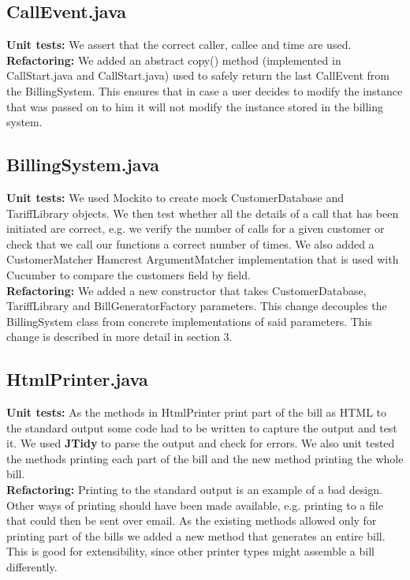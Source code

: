 \documentclass[a4paper]{article}
\begin{document}
\subsection{CallEvent.java}
{\bf Unit tests:} We assert that the correct caller, callee and time are used.
\\{\bf Refactoring:} We added an abstract copy() method (implemented in CallStart.java and CallStart.java) used to safely return the last CallEvent from the BillingSystem. This ensures that in case a user decides to modify the instance that was passed on to him it will not modify the instance stored in the billing system.

\subsection{BillingSystem.java}
{\bf Unit tests:} We used Mockito to create mock CustomerDatabase and TariffLibrary objects. We then test whether all the details of a call that has been initiated are correct, e.g. we verify the number of calls for a given customer or check that we call our functions a correct number of times. We also added a CustomerMatcher Hamcrest ArgumentMatcher implementation that is used with Cucumber to compare the customers field by field.
\\{\bf Refactoring:} We added a new constructor that takes CustomerDatabase, TariffLibrary and BillGeneratorFactory parameters. This change decouples the BillingSystem class from concrete implementations of said parameters. This change is described in more detail in section 3.

\subsection{HtmlPrinter.java}
{\bf Unit tests:} As the methods in HtmlPrinter print part of the bill as HTML to the standard output some code had to be written to capture the output and test it. We used {\bf JTidy} to parse the output and check for errors. We also unit tested the methods printing each part of the bill and the new method printing the whole bill.
\\{\bf Refactoring:} Printing to the standard output is an example of a bad design. Other ways of printing should have been made available, e.g. printing to a file that could then be sent over email. As the existing methods allowed only for printing part of the bills we added a new method that generates an entire bill. This is good for extensibility, since other printer types might assemble a bill differently.
\end{document}
